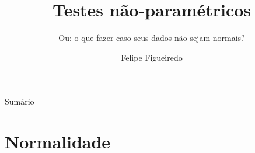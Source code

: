 \documentclass{beamer}
\title%
{Testes não-paramétricos}
\subtitle
{Ou: o que fazer caso seus dados não sejam normais?} %
\author%
{Felipe Figueiredo}%
\institute[INTO] %
{Instituto Nacional de Traumatologia e Ortopedia
}
\date%
{}
\begin{document}
\begin{frame}
  \titlepage
\end{frame}

\begin{frame}{Sumário}
  \tableofcontents
\end{frame}








\section{Normalidade}
\end{document}

